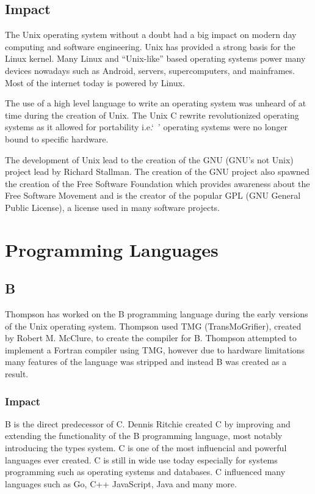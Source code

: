 \documentclass{article}
\begin{document}
\subsection{Impact}
The Unix operating system without a doubt had a big impact on modern day
computing and software engineering. Unix has provided a strong basis for the
Linux kernel. Many Linux and ``Unix-like'' based operating systems power many
devices nowadays such as Android, servers, supercomputers, and mainframes. Most
of the internet today is powered by Linux.

The use of a high level language to write an operating system was unheard of at
time during the creation of Unix. The Unix C rewrite revolutionized operating
systems as it allowed for portability i.e.`\ ' operating systems were no longer
bound to specific hardware.

The development of Unix lead to the creation of the GNU (GNU's not Unix)
project lead by Richard Stallman. The creation of the GNU project also spawned
the creation of the Free Software Foundation which provides awareness about the
Free Software Movement and is the creator of the popular GPL (GNU General
Public License), a license used in many software projects.

\section{Programming Languages}
\subsection{B}
Thompson has worked on the B programming language during the early versions of
the Unix operating system. Thompson used TMG (TransMoGrifier), created by
Robert M. McClure, to create the compiler for B.  Thompson attempted to
implement a Fortran compiler using TMG, however due to hardware limitations
many features of the language was stripped and instead B was created as a
result.\cite{VCF}

\subsubsection{Impact}
B is the direct predecessor of C. Dennis Ritchie created C by improving and
extending the functionality of the B programming language, most notably
introducing the types system. C is one of the most influencial and powerful
languages ever created. C is still in wide use today especially for systems
programming such as operating systems and databases. C influenced many
languages such as Go, C++ JavaScript, Java and many more.
\end{document}
